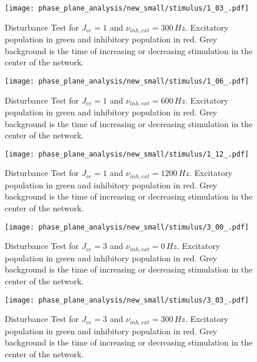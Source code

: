 \documentclass[a4paper,12pt]{article}
\begin{document}
    \begin{figure}
    \centering
        \texttt{[image: phase\_plane\_analysis/new\_small/stimulus/1\_03\_.pdf]}
        \caption{
            Disturbance Test for $J_{ee} = 1$ and $\nu_{inh,ext} = 300 \,\si{Hz}$.
            Excitatory population in green and inhibitory population in red. 
            Grey background is the time of increasing or decreasing stimulation 
            in the center of the network.
            }
    \end{figure}
    
    \begin{figure}
    \centering
        \texttt{[image: phase\_plane\_analysis/new\_small/stimulus/1\_06\_.pdf]}
        \caption{
            Disturbance Test for $J_{ee} = 1$ and $\nu_{inh,ext} = 600 \,\si{Hz}$.
            Excitatory population in green and inhibitory population in red. 
            Grey background is the time of increasing or decreasing stimulation 
            in the center of the network.
            }
    \end{figure}
    
    \begin{figure}
    \centering
        \texttt{[image: phase\_plane\_analysis/new\_small/stimulus/1\_12\_.pdf]}
        \caption{
            Disturbance Test for $J_{ee} = 1$ and $\nu_{inh,ext} = 1200 \,\si{Hz}$.
            Excitatory population in green and inhibitory population in red. 
            Grey background is the time of increasing or decreasing stimulation 
            in the center of the network.
            }
    \end{figure}
    
    \begin{figure}
    \centering
        \texttt{[image: phase\_plane\_analysis/new\_small/stimulus/3\_00\_.pdf]}
        \caption{
            Disturbance Test for $J_{ee} = 3$ and $\nu_{inh,ext} = 0 \,\si{Hz}$.
            Excitatory population in green and inhibitory population in red. 
            Grey background is the time of increasing or decreasing stimulation 
            in the center of the network.
            }
    \end{figure}
    
    \begin{figure}
    \centering
        \texttt{[image: phase\_plane\_analysis/new\_small/stimulus/3\_03\_.pdf]}
        \caption{
            Disturbance Test for $J_{ee} = 3$ and $\nu_{inh,ext} = 300 \,\si{Hz}$.
            Excitatory population in green and inhibitory population in red. 
            Grey background is the time of increasing or decreasing stimulation 
            in the center of the network.
            }
    \end{figure}
    
\end{document}
